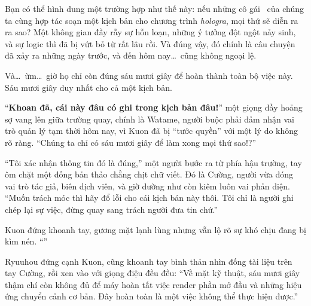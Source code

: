 \documentclass[../main.tex]{subfiles}
\begin{document}

Bạn có thể hình dung một trường hợp như thế này: nếu những cô gái \hll\ của chúng ta cùng hợp tác soạn một kịch bản cho chương trình \textit{hologra}, mọi thứ sẽ diễn ra ra sao? Một không gian đầy rẫy sự hỗn loạn, những ý tưởng đột ngột nảy sinh, và sự logic thì đã bị vứt bỏ từ rất lâu rồi. Và đúng vậy, đó chính là câu chuyện đã xảy ra những ngày trước, và đến hôm nay\dots\ cũng không ngoại lệ.

Và\dots\ ừm\dots\ giờ họ chỉ còn đúng sáu mươi giây để hoàn thành toàn bộ việc này. Sáu mươi giây duy nhất cho cả một kịch bản.

``\textbf{Khoan đã, cái này đâu có ghi trong kịch bản đâu!}'' một giọng đầy hoảng sợ vang lên giữa trường quay, chính là Watame, người buộc phải đảm nhận vai trò quản lý tạm thời hôm nay, vì Kuon đã bị ``tước quyền'' với một lý do không rõ ràng. ``Chúng ta chỉ có sáu mươi giây để làm xong mọi thứ sao!?''

``Tôi xác nhận thông tin đó là đúng,'' một người bước ra từ phía hậu trường, tay ôm chặt một đống bản thảo chằng chịt chữ viết. Đó là Cường, người vừa đóng vai trò tác giả, biên dịch viên, và giờ dường như còn kiêm luôn vai phản diện. ``Muốn trách móc thì hãy đổ lỗi cho cái kịch bản này thôi. Tôi chỉ là người ghi chép lại sự việc, đừng quay sang trách người đưa tin chứ.''

Kuon đứng khoanh tay, gương mặt lạnh lùng nhưng vẫn lộ rõ sự khó chịu đang bị kìm nén. ``''

Ryuuhou đứng cạnh Kuon, cũng khoanh tay bình thản nhìn đống tài liệu trên tay Cường, rồi xen vào với giọng điệu đều đều: ``Về mặt kỹ thuật, sáu mươi giây thậm chí còn không đủ để máy hoàn tất việc render phần mở đầu và những hiệu ứng chuyển cảnh cơ bản. Đây hoàn toàn là một việc không thể thực hiện được.''
\end{document}
